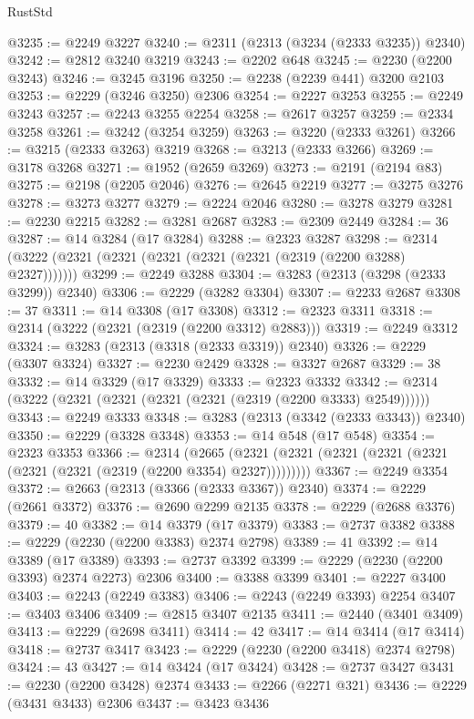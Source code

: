 \begin{lexlean}{RustStd}
\begin{coremodule}
{\begin{coremodule}
{{{{{{{{{{{{{{{{{{{{{{{{{{{{{{{{{{@3235 := @2249 @3227
@3240 := @2311 (@2313 (@3234 (@2333 @3235)) @2340)
@3242 := @2812 @3240 @3219
@3243 := @2202 @648
@3245 := @2230 (@2200 @3243)
@3246 := @3245 @3196
@3250 := @2238 (@2239 @441) @3200 @2103
@3253 := @2229 (@3246 @3250) @2306
@3254 := @2227 @3253
@3255 := @2249 @3243
@3257 := @2243 @3255 @2254
@3258 := @2617 @3257
@3259 := @2334 @3258
@3261 := @3242 (@3254 @3259)
@3263 := @3220 (@2333 @3261)
@3266 := @3215 (@2333 @3263) @3219
@3268 := @3213 (@2333 @3266)
@3269 := @3178 @3268
@3271 := @1952 (@2659 @3269)
@3273 := @2191 (@2194 @83)
@3275 := @2198 (@2205 @2046)
@3276 := @2645 @2219
@3277 := @3275 @3276
@3278 := @3273 @3277
@3279 := @2224 @2046
@3280 := @3278 @3279
@3281 := @2230 @2215
@3282 := @3281 @2687
@3283 := @2309 @2449
@3284 := 36
@3287 := @14 @3284 (@17 @3284)
@3288 := @2323 @3287
@3298 := @2314 (@3222 (@2321 (@2321 (@2321 (@2321 (@2321 (@2319 (@2200 @3288) @2327)))))))
@3299 := @2249 @3288
@3304 := @3283 (@2313 (@3298 (@2333 @3299)) @2340)
@3306 := @2229 (@3282 @3304)
@3307 := @2233 @2687
@3308 := 37
@3311 := @14 @3308 (@17 @3308)
@3312 := @2323 @3311
@3318 := @2314 (@3222 (@2321 (@2319 (@2200 @3312) @2883)))
@3319 := @2249 @3312
@3324 := @3283 (@2313 (@3318 (@2333 @3319)) @2340)
@3326 := @2229 (@3307 @3324)
@3327 := @2230 @2429
@3328 := @3327 @2687
@3329 := 38
@3332 := @14 @3329 (@17 @3329)
@3333 := @2323 @3332
@3342 := @2314 (@3222 (@2321 (@2321 (@2321 (@2321 (@2319 (@2200 @3333) @2549))))))
@3343 := @2249 @3333
@3348 := @3283 (@2313 (@3342 (@2333 @3343)) @2340)
@3350 := @2229 (@3328 @3348)
@3353 := @14 @548 (@17 @548)
@3354 := @2323 @3353
@3366 := @2314
    (@2665 (@2321 (@2321 (@2321 (@2321 (@2321 (@2321 (@2321 (@2319 (@2200 @3354) @2327)))))))))
@3367 := @2249 @3354
@3372 := @2663 (@2313 (@3366 (@2333 @3367)) @2340)
@3374 := @2229 (@2661 @3372)
@3376 := @2690 @2299 @2135
@3378 := @2229 (@2688 @3376)
@3379 := 40
@3382 := @14 @3379 (@17 @3379)
@3383 := @2737 @3382
@3388 := @2229 (@2230 (@2200 @3383) @2374 @2798)
@3389 := 41
@3392 := @14 @3389 (@17 @3389)
@3393 := @2737 @3392
@3399 := @2229 (@2230 (@2200 @3393) @2374 @2273) @2306
@3400 := @3388 @3399
@3401 := @2227 @3400
@3403 := @2243 (@2249 @3383)
@3406 := @2243 (@2249 @3393) @2254
@3407 := @3403 @3406
@3409 := @2815 @3407 @2135
@3411 := @2440 (@3401 @3409)
@3413 := @2229 (@2698 @3411)
@3414 := 42
@3417 := @14 @3414 (@17 @3414)
@3418 := @2737 @3417
@3423 := @2229 (@2230 (@2200 @3418) @2374 @2798)
@3424 := 43
@3427 := @14 @3424 (@17 @3424)
@3428 := @2737 @3427
@3431 := @2230 (@2200 @3428) @2374
@3433 := @2266 (@2271 @321)
@3436 := @2229 (@3431 @3433) @2306
@3437 := @3423 @3436
}}}}}}}}}}}}}}}}}}}}}}}}}}}}}}}}}}
\end{coremodule}}
\end{coremodule}
\end{lexlean}
